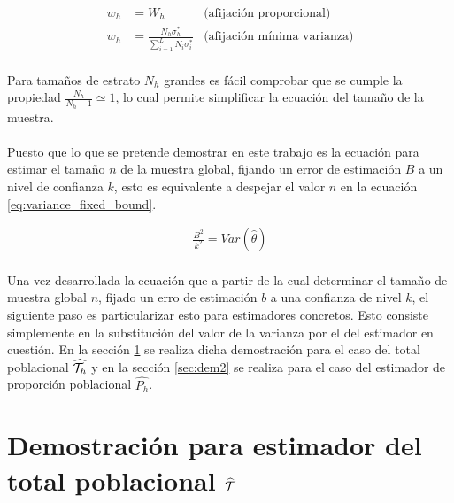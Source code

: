 \documentclass{article}
\begin{document}
    \begin{align}
    \label{eq:w_h_proporcional}
      w_h &= W_h &\text{(afijación proporcional)}\\
    \label{eq:w_h_min_var}
      w_h &= \frac{N_h\sigma_h^*}{\sum\limits_{i=1}^LN_i\sigma_i^*}&\text{(afijación mínima varianza)}
    \end{align}

    \paragraph{}
    Para tamaños de estrato $N_h$ grandes es fácil comprobar que se cumple la propiedad $\frac{N_h}{N_h -1} \simeq 1$, lo cual permite simplificar la ecuación del tamaño de la muestra.

    \paragraph{}
    Puesto que lo que se pretende demostrar en este trabajo es la ecuación para estimar el tamaño $n$ de la muestra global, fijando un error de estimación $B$ a un nivel de confianza $k$, esto es equivalente a despejar el valor $n$ en la ecuación \eqref{eq:variance_fixed_bound}.

    \begin{align}
    \label{eq:variance_fixed_bound}
      \frac{B^2}{k^2} = Var(\widehat{\theta})
    \end{align}

    \paragraph{}
    Una vez desarrollada la ecuación que a partir de la cual determinar el tamaño de muestra global $n$, fijado un erro de estimación $b$ a una confianza de nivel $k$, el siguiente paso es particularizar esto para estimadores concretos. Esto consiste simplemente en la substitución del valor de la varianza por el del estimador en cuestión. En la sección \ref{sec:dem1} se realiza dicha demostración para el caso del total poblacional $\widehat{\mathcal{T}_h}$ y en la sección \ref{sec:dem2} se realiza para el caso del estimador de proporción poblacional $\widehat{P_h}$.


  \section{Demostración para estimador del total poblacional $\widehat{\mathcal{T}}$}
  \label{sec:dem1}
\end{document}

